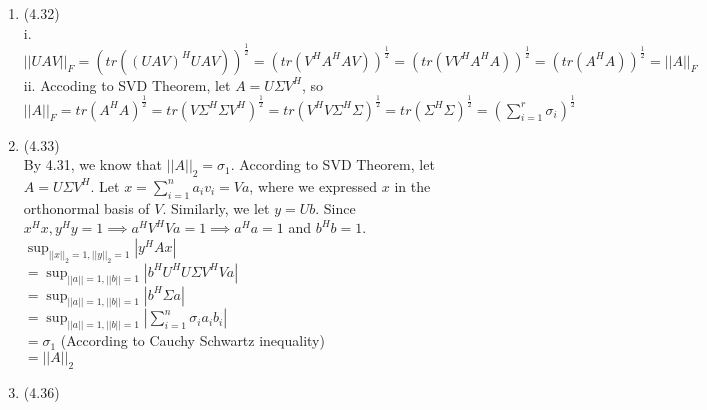 \documentclass[letterpaper,12pt]{article}
\theoremstyle{definition}
\begin{document}
\begin{enumerate}
	\item(4.32)\\
	i. $||UAV||_{F} = (tr((UAV)^{H}UAV))^{\frac{1}{2}} = (tr(V^{H}A^{H}AV))^{\frac{1}{2}} = (tr(VV^{H}A^{H}A))^{\frac{1}{2}} = (tr(A^{H}A))^{\frac{1}{2}} = ||A||_{F}$\\
	ii. Accoding to SVD Theorem, let $A = U\Sigma V^{H}$, so $||A||_{F} = tr(A^{H}A)^{\frac{1}{2}} = tr(V\Sigma^{H}\Sigma V^{H})^{\frac{1}{2}}  = tr(V^{H}V\Sigma^{H}\Sigma)^{\frac{1}{2}} = tr(\Sigma^{H}\Sigma)^{\frac{1}{2}} = (\sum_{i = 1}^{r} \sigma_{i})^{\frac{1}{2}}$\\

	\item(4.33)\\
	By 4.31, we know that $||A||_{2} = \sigma_{1}$. According to SVD Theorem, let $A = U\Sigma V^{H}$. Let $x = \sum_{i = 1}^{n} a_{i}v_{i} = Va$, where we expressed $x$ in the orthonormal basis of $V$. Similarly, we let $y = Ub$. Since $x^{H}x, y^{H}y = 1 \implies a^{H}V^{H}Va = 1 \implies a^{H}a = 1$ and $b^{H}b = 1$.\\
	$\sup_{||x||_{2} = 1, ||y||_{2} = 1}|y^{H}Ax|$\\
	$ = \sup_{||a|| = 1, ||b|| = 1} |b^{H}U^{H}U\Sigma V^{H} Va|$\\
	$= \sup_{||a|| = 1, ||b|| = 1} | b^{H} \Sigma a|$\\
	$=  \sup_{||a|| = 1, ||b|| = 1} |\sum_{i = 1}^{n}\sigma_{i}a_{i}b_{i}| $\\
	$= \sigma_{1}$ (According to Cauchy Schwartz inequality)\\
	$= ||A||_{2} $\\

	\item(4.36)\\
	



\end{enumerate}
\end{document}
